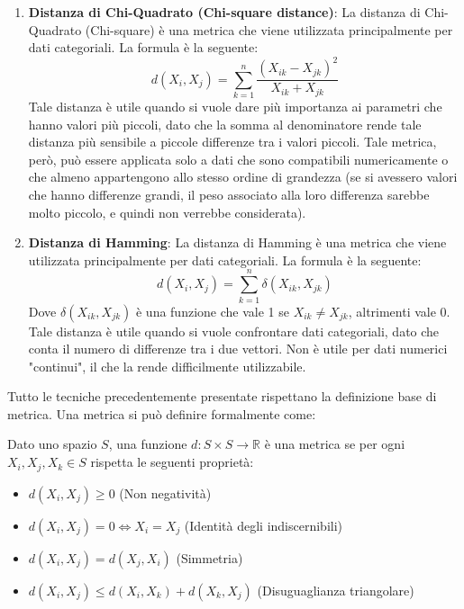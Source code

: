 \begin{enumerate}
    \item \textbf{Distanza di Chi-Quadrato (Chi-square distance)}: La distanza di Chi-Quadrato (Chi-square) è una metrica che viene utilizzata principalmente per dati categoriali. La formula è la seguente: 
    \[d(X_i,X_j) = \sum_{k=1}^{n}\frac{(X_{ik} - X_{jk})^2}{X_{ik} + X_{jk}}\]
    Tale distanza è utile quando si vuole dare più importanza ai parametri che hanno valori più piccoli, dato che la somma al denominatore rende tale distanza più sensibile a piccole differenze tra i valori piccoli. Tale metrica, però, può essere applicata solo a dati che sono compatibili numericamente o che almeno appartengono allo stesso ordine di grandezza (se si avessero valori che hanno differenze grandi, il peso associato alla loro differenza sarebbe molto piccolo, e quindi non verrebbe considerata).

    \item \textbf{Distanza di Hamming}: La distanza di Hamming è una metrica che viene utilizzata principalmente per dati categoriali. La formula è la seguente:
    \[d(X_i,X_j) = \sum_{k=1}^{n}\delta(X_{ik}, X_{jk})\]
    Dove \(\delta(X_{ik}, X_{jk})\) è una funzione che vale 1 se \(X_{ik} \neq X_{jk}\), altrimenti vale 0. Tale distanza è utile quando si vuole confrontare dati categoriali, dato che conta il numero di differenze tra i due vettori. Non è utile per dati numerici "continui", il che la rende difficilmente utilizzabile.

\end{enumerate}

\begin{info}
Tutto le tecniche precedentemente presentate rispettano la definizione base di metrica. Una metrica si può definire formalmente come:

Dato uno spazio \(S\), una funzione \(d: S \times S \rightarrow \mathbb{R}\) è una metrica se per ogni \(X_i, X_j, X_k \in S\) rispetta le seguenti proprietà:
\begin{itemize}
    \item \(d(X_i,X_j) \geq 0\) (Non negatività)
    \item \(d(X_i,X_j) = 0 \iff X_i = X_j\) (Identità degli indiscernibili)
    \item \(d(X_i,X_j) = d(X_j,X_i)\) (Simmetria)
    \item \(d(X_i,X_j) \leq d(X_i,X_k) + d(X_k,X_j)\) (Disuguaglianza triangolare)
\end{itemize}

\end{info}

